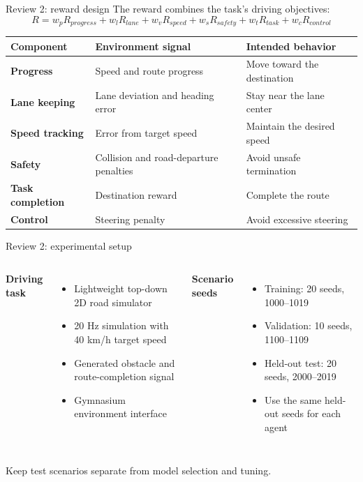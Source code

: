 \documentclass[aspectratio=169,10pt]{beamer}
\begin{document}
\begin{frame}{Review 2: reward design}
\small
The reward combines the task's driving objectives:
\[
R = w_p R_{progress} + w_l R_{lane} + w_v R_{speed}
  + w_s R_{safety} + w_t R_{task} + w_c R_{control}
\]
\begin{tabularx}{\textwidth}{>{\bfseries}p{} X X}
\toprule
Component & Environment signal & Intended behavior \\
\midrule
Progress & Speed and route progress & Move toward the destination \\
Lane keeping & Lane deviation and heading error & Stay near the lane center \\
Speed tracking & Error from target speed & Maintain the desired speed \\
Safety & Collision and road-departure penalties & Avoid unsafe termination \\
Task completion & Destination reward & Complete the route \\
Control & Steering penalty & Avoid excessive steering \\
\bottomrule
\end{tabularx}
\end{frame}

\begin{frame}{Review 2: experimental setup}
\begin{columns}[T]
\textbf{Driving task}
\begin{itemize}
  \item Lightweight top-down 2D road simulator
  \item 20 Hz simulation with 40 km/h target speed
  \item Generated obstacle and route-completion signal
  \item Gymnasium environment interface
\end{itemize}
\textbf{Scenario seeds}
\begin{itemize}
  \item Training: 20 seeds, 1000--1019
  \item Validation: 10 seeds, 1100--1109
  \item Held-out test: 20 seeds, 2000--2019
  \item Use the same held-out seeds for each agent
\end{itemize}
\end{columns}
\vspace{0.4em}
Keep test scenarios separate from model selection and tuning.
\end{frame}
\end{document}
